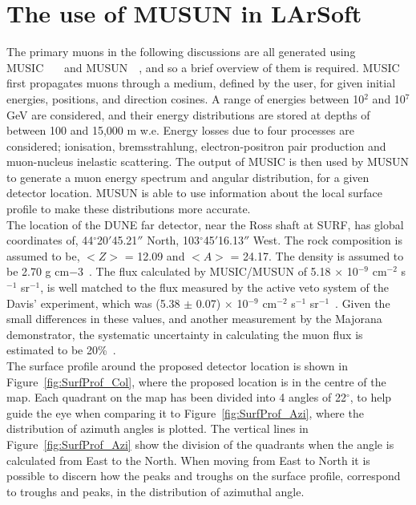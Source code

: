 \section{The use of MUSUN in LArSoft} \label{sec:FDIncorporation}  %
The primary muons in the following discussions are all generated using MUSIC~\citep{MUSUN}~\citep{MUSIC}~\citep{MUSIC2} and MUSUN~\citep{MUSUN}~\citep{MUSUN2}, and so a brief overview of them is required. MUSIC first propagates muons through a medium, defined by the user, for given initial energies, positions, and direction cosines. A range of energies between 10$^2$ and 10$^7$ GeV are considered, and their energy distributions are stored at depths of between 100 and 15,000 m w.e. Energy losses due to four processes are considered; ionisation, bremsstrahlung, electron-positron pair production and muon-nucleus inelastic scattering. The output of MUSIC is then used by MUSUN to generate a muon energy spectrum and angular distribution, for a given detector location. MUSUN is able to use information about the local surface profile to make these distributions more accurate. \\

The location of the DUNE far detector, near the Ross shaft at SURF, has global coordinates of, 44$^{\circ}$20$'$45.21$''$ North, 103$^{\circ}$45$'$16.13$''$ West. The rock composition is assumed to be, $< Z >$ = 12.09 and $< A >$ = 24.17. The density is assumed to be 2.70 g cm${-3}$~\citep{Mei:2009py}. The flux calculated by MUSIC/MUSUN of 5.18 $\times$ 10$^{-9}$ cm$^{-2}$ s$^{-1}$ sr$^{-1}$, is well matched to the flux measured by the active veto system of the Davis' experiment, which was (5.38 $\pm$ 0.07) $\times$ 10$^{-9}$ cm$^{-2}$ s$^{-1}$ sr$^{-1}$~\citep{PhysRevD.27.1444}. Given the small differences in these values, and another measurement by the Majorana demonstrator, the systematic uncertainty in calculating the muon flux is estimated to be 20\%~\citep{NDKTFNote}. \\

The surface profile around the proposed detector location is shown in Figure~\ref{fig:SurfProf_Col}, where the proposed location is in the centre of the map. Each quadrant on the map has been divided into 4 angles of 22$^{\circ}$, to help guide the eye when comparing it to Figure~\ref{fig:SurfProf_Azi}, where the distribution of azimuth angles is plotted. The vertical lines in Figure~\ref{fig:SurfProf_Azi} show the division of the quadrants when the angle is calculated from East to the North. When moving from East to North it is possible to discern how the peaks and troughs on the surface profile, correspond to troughs and peaks, in the distribution of azimuthal angle. \\

